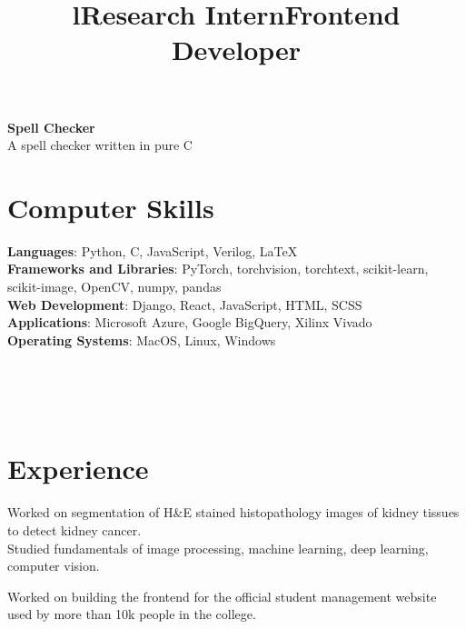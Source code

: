 \documentclass[margin]{res}
\begin{document}
\begin{resume}
      \par
      \textbf{Spell Checker}\\
      A spell checker written in pure C

    \section{Computer Skills}
      \textbf{Languages}: Python, C, JavaScript, Verilog, \LaTeX
      \\
      \textbf{Frameworks and Libraries}: PyTorch, torchvision, torchtext, scikit-learn, scikit-image, OpenCV, numpy, pandas
      \\
      \textbf{Web Development}: Django, React, JavaScript, HTML, SCSS
      \\
      \textbf{Applications}: Microsoft Azure, Google BigQuery, Xilinx Vivado
      \\
      \textbf{Operating Systems}: MacOS, Linux, Windows


    \begin{format}
      \title{l}\\
      \\
      \body\\
    \end{format}

    \section{Experience}
      \title{\textbf{Research Intern}}
      \begin{position}
        Worked on segmentation of H\&E stained histopathology images of kidney tissues to detect kidney cancer.\\
        Studied fundamentals of image processing, machine learning, deep learning, computer vision.
      \end{position}

      \title{\textbf{Frontend Developer}}
      \begin{position}
        Worked on building the frontend for the official student management website used by more than 10k people in the college.
      \end{position}


\end{resume}
\end{document}
